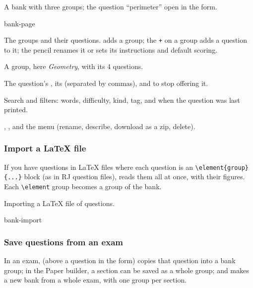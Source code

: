 \documentclass[11pt]{article}
\begin{document}
\begin{keep}
\begin{guidefig}{A bank with three groups; the question ``perimeter'' open in the form.}
\begin{shot}{bank-page}
\end{shot}
\end{guidefig}
\begin{callouts}
  \item The groups and their questions.  adds a group; the \texttt{+} on a group adds a question to it; the pencil renames it or sets its instructions and default scoring.
  \item A group, here \emph{Geometry}, with its 4 questions.
  \item The question's , its  (separated by commas), and  to stop offering it.
  \item Search and filters: words, difficulty, kind, tag, and when the question was last printed.
  \item {}, , and the \ui{$\cdots$} menu (rename, describe, download as a zip, delete).
\end{callouts}
\end{keep}

\subsubsection{Import a LaTeX file}

If you have questions in LaTeX files where each question is an \verb|\element{group}{...}| block (as in RJ question files),  reads them all at once, with their figures. Each \verb|\element| group becomes a group of the bank.

\begin{guidefig}{Importing a LaTeX file of questions.}
\begin{shot}[0.55\linewidth]{bank-import}
\end{shot}
\end{guidefig}

\subsubsection{Save questions from an exam}

In an exam,  (above a question in the form) copies that question into a bank group; in the Paper builder, a section can be saved as a whole group; and  \textrightarrow{}  makes a new bank from a whole exam, with one group per section.
\end{document}
